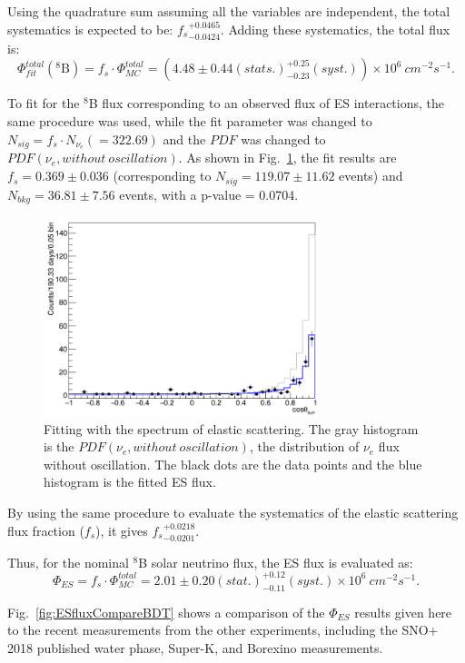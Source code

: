 Using the quadrature sum assuming all the variables are independent, the total systematics is expected to be: ${f_s}^{+0.0465}_{-0.0424}$. Adding these systematics, the total flux is:
\begin{equation}
\Phi^{total}_{fit}(\mathrm{^8 B})=f_s\cdot \Phi^{total}_{MC}=(4.48\pm 0.44(stats.)^{+0.25}_{-0.23}(syst.))\times 10^6~cm^{-2}s^{-1}.
\end{equation}

To fit for the $^8$B flux corresponding to an observed flux of ES interactions, the same procedure was used, while the fit parameter was changed to $N_{sig}=f_s\cdot N_{\nu_e}(=322.69)$ and the $PDF$ was changed to $PDF(\nu_e,without~oscillation)$. As shown in Fig.~\ref{fig:ESfluxFit}, the fit results are $f_s=0.369\pm 0.036$ (corresponding to $N_{sig}=119.07\pm11.62$ events) and $N_{bkg}=36.81\pm 7.56$ events, with a p-value = 0.0704.

\begin{figure}[!htb]
	\centering
	\includegraphics[width=8cm]{ESfluxFit.png}
	\caption[Fitting with the spectrum of elastic scattering.]{Fitting with the spectrum of elastic scattering. The gray histogram is the $PDF(\nu_e,without~oscillation)$, the distribution of $\nu_e$ flux without oscillation. The black dots are the data points and the blue histogram is the fitted ES flux.}
	\label{fig:ESfluxFit}
\end{figure}

By using the same procedure to evaluate the systematics of the elastic scattering flux fraction ($f_s$), it gives ${f_s}^{+0.0218}_{-0.0201}$.

Thus, for the nominal $^8$B solar neutrino flux, the ES flux is evaluated as:
\begin{equation}
\Phi_{ES}=f_s\cdot \Phi^{total}_{MC}=2.01\pm 0.20(stat.)^{+0.12}_{-0.11} (syst.)\times 10^6~cm^{-2}s^{-1}.
\end{equation}

Fig.~\ref{fig:ESfluxCompareBDT} shows a comparison of the $\Phi_{ES}$ results given here to the recent measurements from the other experiments, including the SNO+ 2018 published water phase\cite{anderson2019measurement}, Super-K\cite{abe2016solar}, and Borexino\cite{agostini2020improved} measurements.

